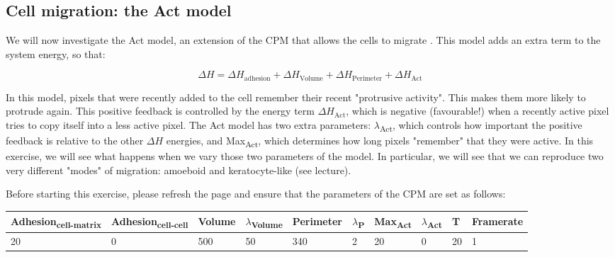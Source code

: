 \documentclass{article}
\begin{document}
\subsection*{Cell migration: the Act model}

We will now investigate the Act model, an extension of the CPM that allows the cells to migrate \cite{niculescu_crawling_2015}. This model adds an extra term to the system energy, so that:

\begin{equation}
	\Delta H = \Delta H_\text{adhesion} + \Delta H_\text{Volume} + \Delta H_\text{Perimeter} + \Delta H_\text{Act}
\end{equation}

In this model, pixels that were recently added to the cell remember their recent "protrusive activity". This makes them more likely to protrude again. This positive feedback is controlled by the energy term $\Delta H_\text{Act}$, which is negative (favourable!) when a recently active pixel tries to copy itself into a less active pixel. The Act model has two extra parameters: $\lambda$\textsubscript{Act}, which controls how important the positive feedback is relative to the other $\Delta H$ energies, and Max\textsubscript{Act}, which determines how long pixels "remember" that they were active. In this exercise, we will see what happens when we vary those two parameters of the model. In particular, we will see that we can reproduce two very different "modes" of migration: amoeboid and keratocyte-like (see lecture).

Before starting this exercise, please refresh the page and ensure that the parameters of the CPM are set as follows:

\begin{center}
\setlength{\tabcolsep}{3pt}
\small
	\begin{tabular}{l l l l l l l l l l }
		Adhesion\textsubscript{cell-matrix} & Adhesion\textsubscript{cell-cell} &
			Volume & $\lambda$\textsubscript{Volume} & 
			Perimeter & $\lambda$\textsubscript{P} &
			Max\textsubscript{Act} & $\lambda$\textsubscript{Act} &
			T & Framerate \\ \hline
		20 & 0 & 500 & 50 & 340 & 2 & 20 & 0 & 20 & 1 \\
	\end{tabular}

\end{center}
\end{document}
